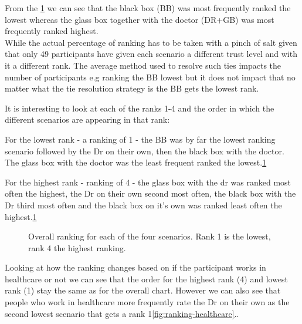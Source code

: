 \documentclass[manuscript,screen,review]{acmart}
\begin{document}
From the \ref{fig:overall-ranking} we can see that the black box (BB) was most frequently ranked the lowest whereas the glass box together with the doctor (DR+GB) was most frequently ranked highest.\\

While the actual percentage of ranking has to be taken with a pinch of salt given that only 49 participants have given each scenario a different trust level and with it a different rank. The average method used to resolve such ties impacts the number of participants e.g ranking the BB lowest but it does not impact that no matter what the tie resolution strategy is the BB gets the lowest rank.

It is interesting to look at each of the ranks 1-4 and the order in which the different scenarios are appearing in that rank:

For the lowest rank - a ranking of 1 - the BB was by far the lowest ranking scenario followed by the Dr on their own, then the black box with the doctor. The glass box with the doctor was the least frequent ranked the lowest.\ref{fig:overall-ranking}

For the highest rank - ranking of 4 - the glass box with the dr was ranked most often the highest, the Dr on their own second most often, the black box with the Dr third most often and the black box on it's own was ranked least often the highest.\ref{fig:overall-ranking}

\begin{figure}[h]
    \caption{Overall ranking for each of the four scenarios. Rank 1 is the lowest, rank 4 the highest ranking.}
    \label{fig:overall-ranking}
\end{figure}

Looking at how the ranking changes based on if the participant works in healthcare or not we can see that the order for the highest rank (4) and lowest rank (1) stay the same as for the overall chart. However we can also see that people who work in healthcare more frequently rate the Dr on their own as the second lowest scenario that gets a rank 1\ref{fig:ranking-healthcare}..
\end{document}
